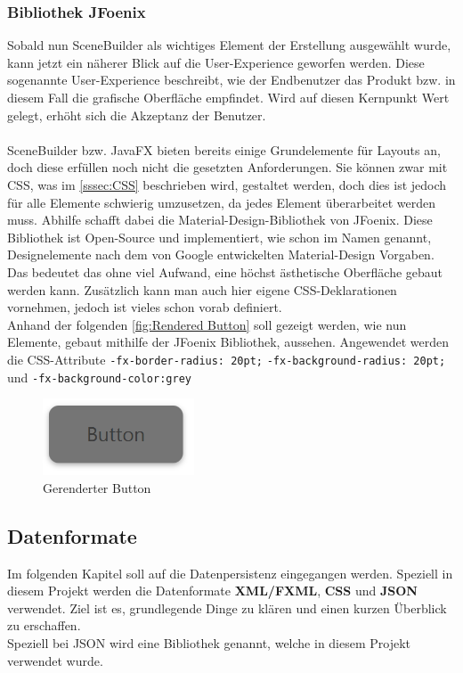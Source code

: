 \subsubsection{Bibliothek JFoenix}
Sobald nun SceneBuilder als wichtiges Element der Erstellung ausgewählt wurde, kann jetzt ein näherer Blick auf die User-Experience geworfen werden.
Diese sogenannte User-Experience beschreibt, wie der Endbenutzer das Produkt bzw. in diesem Fall die grafische Oberfläche empfindet.
Wird auf diesen Kernpunkt Wert gelegt, erhöht sich die Akzeptanz der Benutzer.\\\\
SceneBuilder bzw. JavaFX bieten bereits einige Grundelemente für Layouts an, doch diese erfüllen noch nicht die gesetzten Anforderungen.
Sie können zwar mit CSS, was im \autoref{sssec:CSS} beschrieben wird, gestaltet werden, doch dies ist jedoch für alle Elemente schwierig umzusetzen, da jedes Element überarbeitet werden muss.
Abhilfe schafft dabei die Material-Design-Bibliothek von JFoenix.
Diese Bibliothek ist Open-Source und implementiert, wie schon im Namen genannt, Designelemente nach dem von Google entwickelten Material-Design Vorgaben.
Das bedeutet das ohne viel Aufwand, eine höchst ästhetische Oberfläche gebaut werden kann.
Zusätzlich kann man auch hier eigene CSS-Deklarationen vornehmen, jedoch ist vieles schon vorab definiert.\\
Anhand der folgenden \autoref{fig:Rendered Button} soll gezeigt werden, wie nun Elemente, gebaut mithilfe der JFoenix Bibliothek, aussehen.
Angewendet werden die CSS-Attribute \lstinline{-fx-border-radius: 20pt;}  \lstinline{-fx-background-radius: 20pt;} und \lstinline{-fx-background-color:grey}
\begin{figure}[H]
    \centering
    \includegraphics[width=0.4\textwidth]{fig/ainf/RenderedButton.PNG}
    \caption{Gerenderter Button}
    \label{fig:Rendered Button}
\end{figure}
\subsection{Datenformate}\label{subsec:datenformate-in-java-fx}
Im folgenden Kapitel soll auf die Datenpersistenz eingegangen werden.
Speziell in diesem Projekt werden die Datenformate \textbf{XML/FXML}, \textbf{CSS} und \textbf{JSON} verwendet.
Ziel ist es, grundlegende Dinge zu klären und einen kurzen Überblick zu erschaffen.\\
Speziell bei JSON wird eine Bibliothek genannt, welche in diesem Projekt verwendet wurde.
